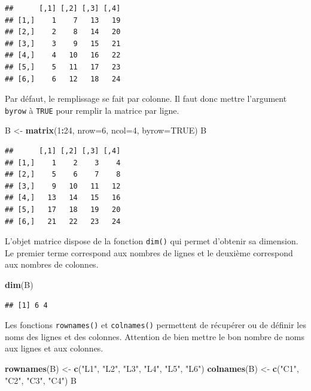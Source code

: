 \documentclass[
]{book}
\newenvironment{Shaded}{\begin{snugshade}}{\end{snugshade}}
\newcommand{\AttributeTok}[1]{\textcolor[rgb]{0.13,0.29,0.53}{#1}}
\newcommand{\ConstantTok}[1]{\textcolor[rgb]{0.56,0.35,0.01}{#1}}
\newcommand{\DecValTok}[1]{\textcolor[rgb]{0.00,0.00,0.81}{#1}}
\newcommand{\FunctionTok}[1]{\textcolor[rgb]{0.13,0.29,0.53}{\textbf{#1}}}
\newcommand{\NormalTok}[1]{#1}
\newcommand{\OtherTok}[1]{\textcolor[rgb]{0.56,0.35,0.01}{#1}}
\newcommand{\SpecialCharTok}[1]{\textcolor[rgb]{0.81,0.36,0.00}{\textbf{#1}}}
\newcommand{\StringTok}[1]{\textcolor[rgb]{0.31,0.60,0.02}{#1}}
\begin{document}
\begin{verbatim}
##      [,1] [,2] [,3] [,4]
## [1,]    1    7   13   19
## [2,]    2    8   14   20
## [3,]    3    9   15   21
## [4,]    4   10   16   22
## [5,]    5   11   17   23
## [6,]    6   12   18   24
\end{verbatim}

Par défaut, le remplissage se fait par colonne. Il faut donc mettre l'argument \texttt{byrow} à \texttt{TRUE} pour remplir la matrice par ligne.

\begin{Shaded}
\begin{Highlighting}[]
\NormalTok{B }\OtherTok{\textless{}{-}} \FunctionTok{matrix}\NormalTok{(}\DecValTok{1}\SpecialCharTok{:}\DecValTok{24}\NormalTok{, }\AttributeTok{nrow=}\DecValTok{6}\NormalTok{, }\AttributeTok{ncol=}\DecValTok{4}\NormalTok{, }\AttributeTok{byrow=}\ConstantTok{TRUE}\NormalTok{)}
\NormalTok{B}
\end{Highlighting}
\end{Shaded}

\begin{verbatim}
##      [,1] [,2] [,3] [,4]
## [1,]    1    2    3    4
## [2,]    5    6    7    8
## [3,]    9   10   11   12
## [4,]   13   14   15   16
## [5,]   17   18   19   20
## [6,]   21   22   23   24
\end{verbatim}

L'objet matrice dispose de la fonction \texttt{dim()} qui permet d'obtenir sa dimension. Le premier terme correspond aux nombres de lignes et le deuxième correspond aux nombres de colonnes.

\begin{Shaded}
\begin{Highlighting}[]
\FunctionTok{dim}\NormalTok{(B)}
\end{Highlighting}
\end{Shaded}

\begin{verbatim}
## [1] 6 4
\end{verbatim}

Les fonctions \texttt{rownames()} et \texttt{colnames()} permettent de récupérer ou de définir les noms des lignes et des colonnes. Attention de bien mettre le bon nombre de noms aux lignes et aux colonnes.

\begin{Shaded}
\begin{Highlighting}[]
\FunctionTok{rownames}\NormalTok{(B) }\OtherTok{\textless{}{-}} \FunctionTok{c}\NormalTok{(}\StringTok{"L1"}\NormalTok{, }\StringTok{"L2"}\NormalTok{, }\StringTok{"L3"}\NormalTok{, }\StringTok{"L4"}\NormalTok{, }\StringTok{"L5"}\NormalTok{, }\StringTok{"L6"}\NormalTok{)}
\FunctionTok{colnames}\NormalTok{(B) }\OtherTok{\textless{}{-}} \FunctionTok{c}\NormalTok{(}\StringTok{"C1"}\NormalTok{, }\StringTok{"C2"}\NormalTok{, }\StringTok{"C3"}\NormalTok{, }\StringTok{"C4"}\NormalTok{)}
\NormalTok{B}
\end{Highlighting}
\end{Shaded}
\end{document}
